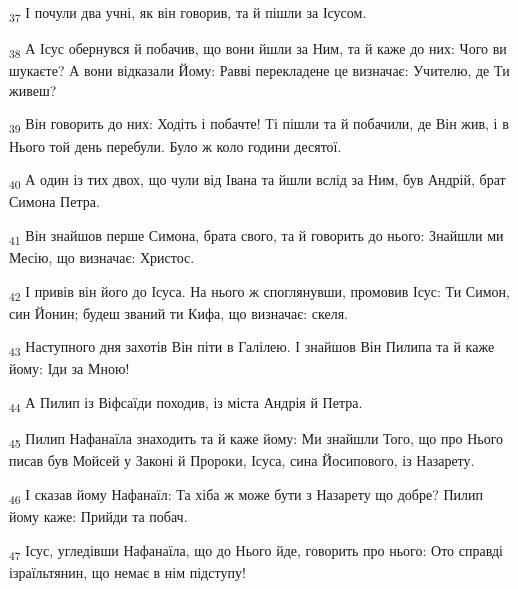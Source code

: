 \begin{tcolorbox}
\textsubscript{37} І почули два учні, як він говорив, та й пішли за Ісусом.
\end{tcolorbox}
\begin{tcolorbox}
\textsubscript{38} А Ісус обернувся й побачив, що вони йшли за Ним, та й каже до них: Чого ви шукаєте? А вони відказали Йому: Равві перекладене це визначає: Учителю, де Ти живеш?
\end{tcolorbox}
\begin{tcolorbox}
\textsubscript{39} Він говорить до них: Ходіть і побачте! Ті пішли та й побачили, де Він жив, і в Нього той день перебули. Було ж коло години десятої.
\end{tcolorbox}
\begin{tcolorbox}
\textsubscript{40} А один із тих двох, що чули від Івана та йшли вслід за Ним, був Андрій, брат Симона Петра.
\end{tcolorbox}
\begin{tcolorbox}
\textsubscript{41} Він знайшов перше Симона, брата свого, та й говорить до нього: Знайшли ми Месію, що визначає: Христос.
\end{tcolorbox}
\begin{tcolorbox}
\textsubscript{42} І привів він його до Ісуса. На нього ж споглянувши, промовив Ісус: Ти Симон, син Йонин; будеш званий ти Кифа, що визначає: скеля.
\end{tcolorbox}
\begin{tcolorbox}
\textsubscript{43} Наступного дня захотів Він піти в Галілею. І знайшов Він Пилипа та й каже йому: Іди за Мною!
\end{tcolorbox}
\begin{tcolorbox}
\textsubscript{44} А Пилип із Віфсаїди походив, із міста Андрія й Петра.
\end{tcolorbox}
\begin{tcolorbox}
\textsubscript{45} Пилип Нафанаїла знаходить та й каже йому: Ми знайшли Того, що про Нього писав був Мойсей у Законі й Пророки, Ісуса, сина Йосипового, із Назарету.
\end{tcolorbox}
\begin{tcolorbox}
\textsubscript{46} І сказав йому Нафанаїл: Та хіба ж може бути з Назарету що добре? Пилип йому каже: Прийди та побач.
\end{tcolorbox}
\begin{tcolorbox}
\textsubscript{47} Ісус, угледівши Нафанаїла, що до Нього йде, говорить про нього: Ото справді ізраїльтянин, що немає в нім підступу!
\end{tcolorbox}
